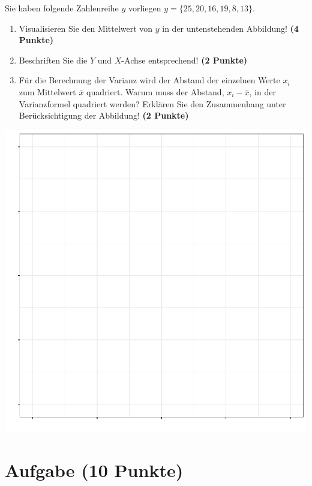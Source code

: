 \documentclass[a4paper, 10pt]{scrartcl}\usepackage[]{graphicx}\usepackage[]{color}
\makeatletter
\def\maxwidth{ %
  \ifdim\Gin@nat@width>\linewidth
    \linewidth
  \else
    \Gin@nat@width
  \fi
}
\makeatother
\begin{document}
Sie haben folgende Zahlenreihe $y$ vorliegen
$y = \{25, 20, 16, 19, 8, 13\}$.

\begin{enumerate}
\item Visualisieren Sie den Mittelwert von $y$ in der untenstehenden
  Abbildung! \textbf{(4 Punkte)}
\item Beschriften Sie die $Y$ und $X$-Achse entsprechend! \textbf{(2 Punkte)}
\item F{\"u}r die Berechnung der Varianz wird der Abstand der einzelnen Werte $x_i$
  zum Mittelwert $\bar{x}$ quadriert. Warum muss der Abstand, $x_i -
  \bar{x}$, in der Varianzformel quadriert werden?
  Erkl{\"a}ren Sie den Zusammenhang unter Ber{\"u}cksichtigung der Abbildung!
  \textbf{(2 Punkte)}  
\end{enumerate}



{\centering \includegraphics[width=\maxwidth]{img/desc-01-1} 

}


 
\clearpage

\section{Aufgabe \hfill (10 Punkte)}
\end{document}

